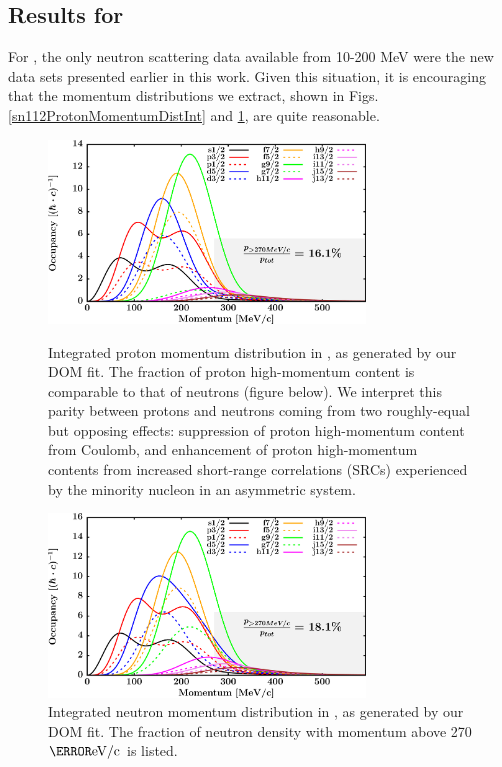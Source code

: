 \subsection{Results for \snTwelve}
For \snTwelve, the only neutron scattering data available from 10-200 MeV were the new data sets
presented earlier in this work. Given this situation, it is encouraging that the momentum
distributions we extract, shown in Figs. \ref{sn112ProtonMomentumDistInt} and
\ref{sn112NeutronMomentumDistInt}, are quite reasonable.
\begin{figure}[tb]
    \centering
    \includegraphics[width=0.75\textwidth]{figures/sn112_protonLJMomentumDistIntegral.png}
    \caption[Proton momentum distribution in \snTwelve]
    {
        Integrated proton momentum distribution in \snTwelve, as generated
        by our DOM fit. The fraction of proton high-momentum content is
        comparable to that of neutrons
        (figure below). We interpret this parity between protons and neutrons coming from two
        roughly-equal but opposing effects: suppression of proton high-momentum content
        from Coulomb, and enhancement of proton high-momentum contents from increased
        short-range correlations (SRCs) experienced by the minority nucleon in an
        asymmetric system.
    }
    \label{sn112ProtonMomentumDistInt}
    \vspace{16pt}
    \includegraphics[width=0.75\textwidth]{figures/sn112_neutronLJMomentumDistIntegral.png}
    \caption[Neutron momentum distributions in \snTwelve]
    {
        Integrated neutron momentum distribution in \snTwelve, as generated
        by our DOM fit. The fraction of neutron density with
        momentum above 270 $\mega\electronvolt/\text{c}$ is listed.
    }
    \label{sn112NeutronMomentumDistInt}
\end{figure}


